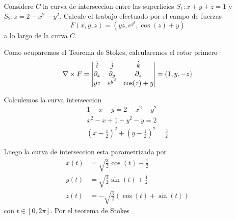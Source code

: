 \message{ !name(MAT024.tex)}\documentclass[../main.tex]{subfiles}
\begin{document}
\begin{problem}
  Considere $C$ la curva de interseccion entre las superficies $S_{1}: x + y + z = 1$ y $S_{2} : z = 2 - x^{2} - y^{2}$. Calcule el trabajo efectuado por el campo de fuerzas
  \begin{equation*}
    F(x, y, z) = (yz, e^{y^{3}}, \cos(z) + y)
  \end{equation*}
  a lo largo de la curva $C$.
\end{problem}
\begin{solution}
  Como ocuparemos el Teorema de Stokes, calcularemos el rotor primero
  \begin{equation*}
    \nabla \times F = \begin{vmatrix} \hat{i} & \hat{j} & \hat{k}\\ \partial_x & \partial_y & \partial_z\\ yz & e^{y^{3}} & \cos(z) + y\end{vmatrix} = (1, y, -z)
  \end{equation*}

  Calculemos la curva interseccion
  \begin{gather*}
    1 - x - y = 2 - x^{2} - y^{2}\\
    x^{2} - x + 1 + y^{2} - y = 2\\
    (x - \frac{1}{2})^{2} + (y - \frac{1}{2})^{2} = \frac{3}{2}
  \end{gather*}

  Luego la curva de interseccion esta parametrizada por
  \begin{align*}
    x(t) &= \sqrt{\frac{3}{2}} \cos(t) + \frac{1}{2}\\
    y(t) &= \sqrt{\frac{3}{2}} \sin(t) + \frac{1}{2}\\
    z(t) &= - \sqrt{\frac{3}{2}}(\cos(t) + \sin(t))
  \end{align*}
  con $t \in [0, 2\pi]$. Por el teorema de Stokes
\end{solution}
\end{document}
